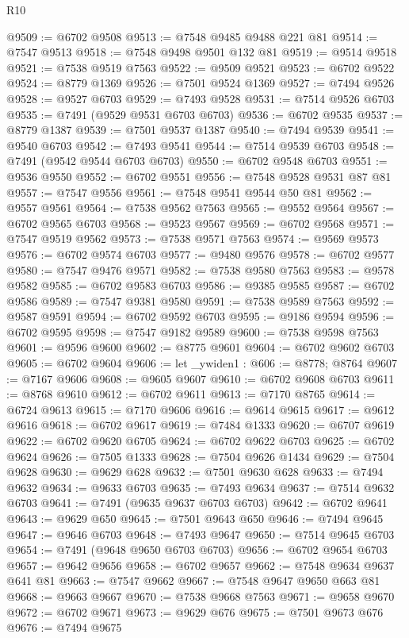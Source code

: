 \begin{lexlean}{R10}
\begin{coremodule}
@9509 := @6702 @9508
@9513 := @7548 @9485 @9488 @221 @81
@9514 := @7547 @9513
@9518 := @7548 @9498 @9501 @132 @81
@9519 := @9514 @9518
@9521 := @7538 @9519 @7563
@9522 := @9509 @9521
@9523 := @6702 @9522
@9524 := @8779 @1369
@9526 := @7501 @9524 @1369
@9527 := @7494 @9526
@9528 := @9527 @6703
@9529 := @7493 @9528
@9531 := @7514 @9526 @6703
@9535 := @7491 (@9529 @9531 @6703 @6703)
@9536 := @6702 @9535
@9537 := @8779 @1387
@9539 := @7501 @9537 @1387
@9540 := @7494 @9539
@9541 := @9540 @6703
@9542 := @7493 @9541
@9544 := @7514 @9539 @6703
@9548 := @7491 (@9542 @9544 @6703 @6703)
@9550 := @6702 @9548 @6703
@9551 := @9536 @9550
@9552 := @6702 @9551
@9556 := @7548 @9528 @9531 @87 @81
@9557 := @7547 @9556
@9561 := @7548 @9541 @9544 @50 @81
@9562 := @9557 @9561
@9564 := @7538 @9562 @7563
@9565 := @9552 @9564
@9567 := @6702 @9565 @6703
@9568 := @9523 @9567
@9569 := @6702 @9568
@9571 := @7547 @9519 @9562
@9573 := @7538 @9571 @7563
@9574 := @9569 @9573
@9576 := @6702 @9574 @6703
@9577 := @9480 @9576
@9578 := @6702 @9577
@9580 := @7547 @9476 @9571
@9582 := @7538 @9580 @7563
@9583 := @9578 @9582
@9585 := @6702 @9583 @6703
@9586 := @9385 @9585
@9587 := @6702 @9586
@9589 := @7547 @9381 @9580
@9591 := @7538 @9589 @7563
@9592 := @9587 @9591
@9594 := @6702 @9592 @6703
@9595 := @9186 @9594
@9596 := @6702 @9595
@9598 := @7547 @9182 @9589
@9600 := @7538 @9598 @7563
@9601 := @9596 @9600
@9602 := @8775 @9601
@9604 := @6702 @9602 @6703
@9605 := @6702 @9604
@9606 := let _ywiden1 : @606 := @8778; @8764
@9607 := @7167 @9606
@9608 := @9605 @9607
@9610 := @6702 @9608 @6703
@9611 := @8768 @9610
@9612 := @6702 @9611
@9613 := @7170 @8765
@9614 := @6724 @9613
@9615 := @7170 @9606
@9616 := @9614 @9615
@9617 := @9612 @9616
@9618 := @6702 @9617
@9619 := @7484 @1333
@9620 := @6707 @9619
@9622 := @6702 @9620 @6705
@9624 := @6702 @9622 @6703
@9625 := @6702 @9624
@9626 := @7505 @1333
@9628 := @7504 @9626 @1434
@9629 := @7504 @9628
@9630 := @9629 @628
@9632 := @7501 @9630 @628
@9633 := @7494 @9632
@9634 := @9633 @6703
@9635 := @7493 @9634
@9637 := @7514 @9632 @6703
@9641 := @7491 (@9635 @9637 @6703 @6703)
@9642 := @6702 @9641
@9643 := @9629 @650
@9645 := @7501 @9643 @650
@9646 := @7494 @9645
@9647 := @9646 @6703
@9648 := @7493 @9647
@9650 := @7514 @9645 @6703
@9654 := @7491 (@9648 @9650 @6703 @6703)
@9656 := @6702 @9654 @6703
@9657 := @9642 @9656
@9658 := @6702 @9657
@9662 := @7548 @9634 @9637 @641 @81
@9663 := @7547 @9662
@9667 := @7548 @9647 @9650 @663 @81
@9668 := @9663 @9667
@9670 := @7538 @9668 @7563
@9671 := @9658 @9670
@9672 := @6702 @9671
@9673 := @9629 @676
@9675 := @7501 @9673 @676
@9676 := @7494 @9675

\end{coremodule}
\end{lexlean}
